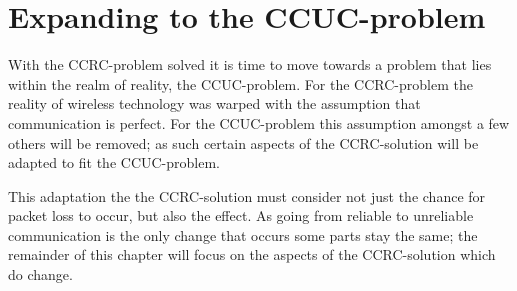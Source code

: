 \chapter{Expanding to the CCUC-problem}\label{CCUC}
With the CCRC-problem solved it is time to move towards a problem that lies within the realm of reality, the CCUC-problem.
For the CCRC-problem the reality of wireless technology was warped with the assumption that communication is perfect.
For the CCUC-problem this assumption amongst a few others will be removed; as such certain aspects of the CCRC-solution will be adapted to fit the CCUC-problem.

This adaptation the the CCRC-solution must consider not just the chance for packet loss to occur, but also the effect.
As going from reliable to unreliable communication is the only change that occurs some parts stay the same; the remainder of this chapter will focus on the aspects of the CCRC-solution which do change.





